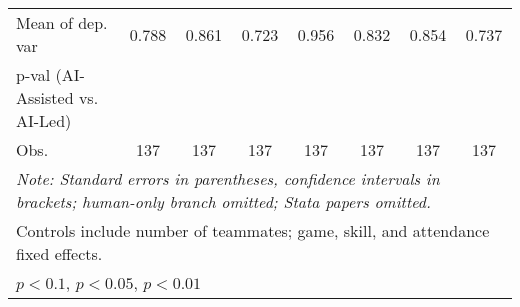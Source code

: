 \begin{tabular}{l*{7}{c}}
Mean of dep. var    &    0.788   &    0.861   &    0.723   &    0.956   &    0.832   &    0.854   &    0.737   \\
p-val (AI-Assisted vs. AI-Led)&   &   &   &   &   &   &   \\
Obs.                &137   &137   &137   &137   &137   &137   &137   \\
\hline
\hline\hline
\multicolumn{8}{l}{\it{Note:} Standard errors in parentheses, confidence intervals in brackets; human-only branch omitted; Stata papers omitted.}\\
\multicolumn{8}{l}{Controls include number of teammates; game, skill, and attendance fixed effects.}\\
\multicolumn{8}{l}{\sym{*} \(p<0.1\), \sym{**} \(p<0.05\), \sym{***} \(p<0.01\)}\\
\end{tabular}
